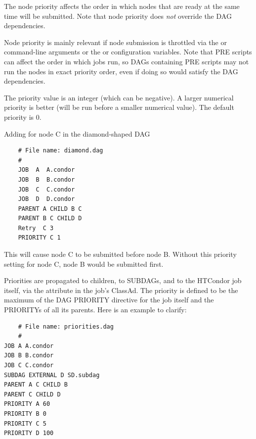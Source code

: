   

The node priority affects the order in which nodes that are ready
at the same time will be submitted.  Note that node priority does
\emph{not} override the DAG dependencies.

Node priority is mainly relevant if
node submission is throttled via the  or 
command-line arguments or the  or
 configuration variables.  Note that PRE
scripts can affect the order in which jobs run, so DAGs containing
PRE scripts may not run the nodes in exact priority order, even if
doing so would satisfy the DAG dependencies.

The priority value is an integer (which can be negative).  A larger
numerical priority is better (will be run before a smaller numerical
value).  The default priority is 0.

Adding  for node C in the diamond-shaped
DAG
\footnotesize
\begin{verbatim}
    # File name: diamond.dag
    #
    JOB  A  A.condor 
    JOB  B  B.condor 
    JOB  C  C.condor	
    JOB  D  D.condor
    PARENT A CHILD B C
    PARENT B C CHILD D
    Retry  C 3
    PRIORITY C 1
\end{verbatim}
\normalsize

This will cause node C to be submitted before node B.
Without this priority setting for node C, node B would be submitted first.

Priorities are propagated to children, to SUBDAGs, 
and to the HTCondor job itself,
via the  attribute in the job's ClassAd. 
The priority is defined to be the maximum of the DAG PRIORITY directive 
for the job itself and the PRIORITYs of all its parents. 
Here is an example to clarify:

\footnotesize
\begin{verbatim}
    # File name: priorities.dag
    #
JOB A A.condor
JOB B B.condor
JOB C C.condor
SUBDAG EXTERNAL D SD.subdag
PARENT A C CHILD B
PARENT C CHILD D
PRIORITY A 60
PRIORITY B 0
PRIORITY C 5
PRIORITY D 100
\end{verbatim}
\normalsize


